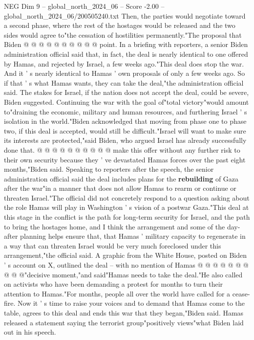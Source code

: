 \begin{textsample}{NEG Dim 9 – global\_north\_2024\_06 – Score -2.00 – global\_north\_2024\_06/200505240.txt}
Then, the parties would negotiate toward a second phase, where the rest of the hostages would be released and the two sides would agree to"the cessation of hostilities permanently."The proposal that Biden @ @ @ @ @ @ @ @ @ @ point.
In a briefing with reporters, a senior Biden administration official said that, in fact, the deal is nearly identical to one offered by Hamas, and rejected by Israel, a few weeks ago."This deal does stop the war.
And it ' s nearly identical to Hamas ' own proposals of only a few weeks ago.
So if that ' s what Hamas wants, they can take the deal,"the administration official said.
The stakes for Israel, if the nation does not accept the deal, could be severe, Biden suggested.
Continuing the war with the goal of"total victory"would amount to"draining the economic, military and human resources, and furthering Israel ' s isolation in the world."Biden acknowledged that moving from phase one to phase two, if this deal is accepted, would still be difficult."Israel will want to make sure its interests are protected,"said Biden, who argued Israel has already successfully done that. @ @ @ @ @ @ @ @ @ @ make this offer without any further risk to their own security because they ' ve devastated Hamas forces over the past eight months,"Biden said.
Speaking to reporters after the speech, the senior administration official said the deal includes plans for the \textbf{rebuilding} of Gaza after the war"in a manner that does not allow Hamas to rearm or continue or threaten Israel."The official did not concretely respond to a question asking about the role Hamas will play in Washington ' s vision of a postwar Gaza."This deal at this stage in the conflict is the path for long-term security for Israel, and the path to bring the hostages home, and I think the arrangement and some of the day-after planning helps ensure that, that Hamas ' military capacity to regenerate in a way that can threaten Israel would be very much foreclosed under this arrangement,"the official said.
A graphic from the White House, posted on Biden ' s account on X, outlined the deal -- with no mention of Hamas @ @ @ @ @ @ @ @ @ @"decisive moment,"and said"Hamas needs to take the deal."He also called on activists who have been demanding a protest for months to turn their attention to Hamas."For months, people all over the world have called for a cease-fire.
Now it ' s time to raise your voices and to demand that Hamas come to the table, agrees to this deal and ends this war that they began,"Biden said.
Hamas released a statement saying the terrorist group"positively views"what Biden laid out in his speech.

\end{textsample}
